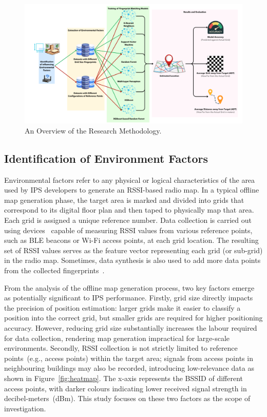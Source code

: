 \documentclass[runningheads]{llncs}
\begin{document}
\begin{figure}[th!]
        \centering
        \includegraphics[width=\linewidth]{figures/meth1.png}
        \caption{An Overview of the Research Methodology.}
        \label{fig:research-method}
\end{figure}

\subsection{Identification of Environment Factors}\label{ssec:identification-env-factors}

Environmental factors refer to any physical or logical characteristics of the area used by IPS developers to generate an RSSI-based radio map. In a typical offline map generation phase, the target area is marked and divided into grids that correspond to its digital floor plan and then taped to physically map that area. Each grid is assigned a unique reference number. Data collection is carried out using devices~\cite{add3,add4} capable of measuring RSSI values from various reference points, such as BLE beacons or Wi-Fi access points, at each grid location. The resulting set of RSSI values serves as the feature vector representing each grid (or sub-grid) in the radio map. Sometimes, data synthesis is also used to add more data points from the collected fingerprints~\cite{LRE6}.

From the analysis of the offline map generation process, two key factors emerge as potentially significant to IPS performance. Firstly, grid size directly impacts the precision of position estimation: larger grids make it easier to classify a position into the correct grid, but smaller grids are required for higher positioning accuracy. However, reducing grid size substantially increases the labour required for data collection, rendering map generation impractical for large-scale environments. Secondly, RSSI collection is not strictly limited to reference points~(e.g., access points) within the target area; signals from access points in neighbouring buildings may also be recorded, introducing low-relevance data as shown in Figure~\ref{fig:heatmap}. The x-axis represents the BSSID of different access points, with darker colours indicating lower received signal strength in decibel-meters~(dBm). This study focuses on these two factors as the scope of investigation.
\end{document}
